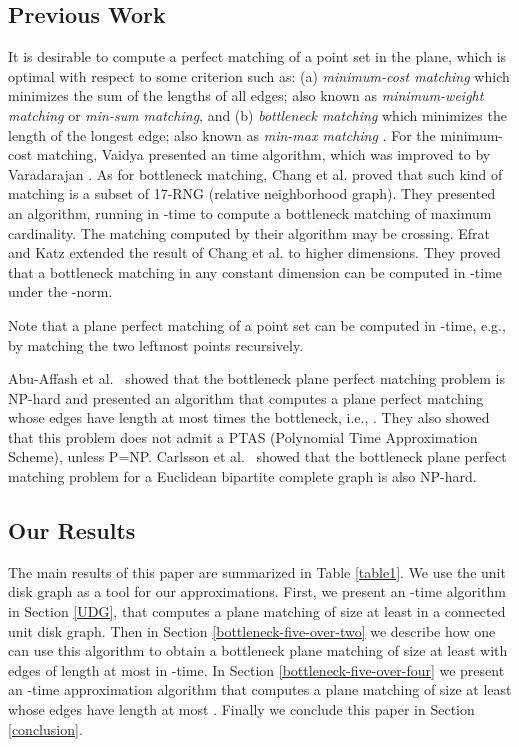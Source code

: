 \documentclass[11pt,a4paper]{article}
\begin{document}
\subsection{Previous Work}

It is desirable to compute a perfect matching of a point set in the plane, which is optimal with respect to some criterion such as: (a) {\em minimum-cost matching} which minimizes the sum of the lengths of all edges; also known as {\em minimum-weight matching} or {\em min-sum matching}, and (b) {\em bottleneck matching} which minimizes the length of the longest edge; also known as {\em min-max matching} \cite{Efrat2000}. For the minimum-cost matching, Vaidya \cite{Vaidya1989} presented an  time algorithm, which was improved to  by Varadarajan \cite{Varadarajan1998}. As for bottleneck matching, Chang et al. \cite{Chang1992} proved that such kind of matching is a subset of 17-RNG (relative neighborhood graph). They presented an algorithm, running in -time to compute a bottleneck matching of maximum cardinality. The matching computed by their algorithm may be crossing.
Efrat and Katz \cite{Efrat2000} extended the result of Chang et al. \cite{Chang1992} to higher dimensions. They proved that a bottleneck matching in any constant dimension can be computed in -time under the -norm. 

Note that a plane perfect matching of a point set can be computed in -time, e.g., by matching the two leftmost points recursively.

Abu-Affash et al.~\cite{Abu-Affash2014} showed that the bottleneck plane perfect matching problem is NP-hard and presented an algorithm that computes a plane perfect matching whose edges have length at most  times the bottleneck, i.e., . They also showed that this problem does not
admit a PTAS (Polynomial Time Approximation Scheme), unless P=NP. Carlsson et al.~\cite{Carlsson2010} showed that the bottleneck plane perfect matching problem for a Euclidean bipartite complete graph is also NP-hard.

\subsection{Our Results}

The main results of this paper are summarized in Table \ref{table1}. We use the unit disk graph as a tool for our approximations. First, we present an -time algorithm in Section \ref{UDG}, that computes a plane matching of size at least  in a connected unit disk graph. Then in Section \ref{bottleneck-five-over-two} we describe how one can use this algorithm to obtain a bottleneck plane matching of size at least  with edges of length at most  in -time.
In Section \ref{bottleneck-five-over-four} we present an -time approximation algorithm that computes a plane matching of size at least  whose edges have length at most . Finally we conclude this paper in Section \ref{conclusion}.
\end{document}
